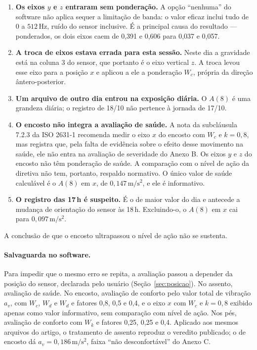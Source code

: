 \documentclass[11pt,a4paper]{article}
\newcommand{\unit}[2]{\ensuremath{#1\,\mathrm{#2}}}
\begin{document}
\begin{enumerate}
\item \textbf{Os eixos $y$ e $z$ entraram sem ponderação.} A opção ``nenhuma''
      do software não aplica sequer a limitação de banda: o valor eficaz inclui
      tudo de 0 a \unit{512}{Hz}, ruído do sensor inclusive. É a principal causa
      do resultado --- ponderados, os dois eixos caem de 0,391 e 0,606 para
      0,037 e 0,057.
\item \textbf{A troca de eixos estava errada para esta sessão.} Neste dia a
      gravidade está na coluna 3 do sensor, que portanto é o eixo vertical $z$.
      A troca levou esse eixo para a posição $x$ e aplicou a ele a ponderação
      $W_c$, própria da direção ântero-posterior.
\item \textbf{Um arquivo de outro dia entrou na exposição diária.} O $A(8)$ é
      uma grandeza diária; o registro de 18/10 não pertence à jornada de 17/10.
\item \textbf{O encosto não integra a avaliação de saúde.} A nota da subcláusula
      7.2.3 da ISO 2631-1 recomenda medir o eixo $x$ do encosto com $W_c$ e
      $k = 0{,}8$, mas registra que, pela falta de evidência sobre o efeito
      desse movimento na saúde, ele não entra na avaliação de severidade do
      Anexo B. Os eixos $y$ e $z$ do encosto não têm ponderação de saúde. A
      comparação com o nível de ação da diretiva não tem, portanto, respaldo
      normativo. O único valor de saúde calculável é o $A(8)$ em $x$, de
      \unit{0{,}147}{m/s^2}, e ele é informativo.
\item \textbf{O registro das 17\,h é suspeito.} É o de maior valor do dia e
      antecede a mudança de orientação do sensor às 18\,h. Excluindo-o, o
      $A(8)$ em $x$ cai para \unit{0{,}097}{m/s^2}.
\end{enumerate}

A conclusão de que o encosto ultrapassou o nível de ação não se sustenta.

\paragraph{Salvaguarda no software.} Para impedir que o mesmo erro se repita, a
avaliação passou a depender da posição do sensor, declarada pelo usuário
(Seção~\ref{sec:posicao}). No assento, avaliação de saúde. No encosto, avaliação
de conforto pelo valor total de vibração $a_v$, com $W_c$, $W_d$ e $W_d$ e
fatores 0,8, 0,5 e 0,4, e o eixo $x$ com $W_c$ e $k = 0{,}8$ exibido apenas como
valor informativo, sem comparação com nível de ação. Nos pés, avaliação de
conforto com $W_k$ e fatores 0,25, 0,25 e 0,4. Aplicado aos mesmos arquivos do
artigo, o tratamento de assento reproduz o veredito publicado; o de encosto dá
$a_v = \unit{0{,}186}{m/s^2}$, faixa ``não desconfortável'' do Anexo C.
\end{document}
